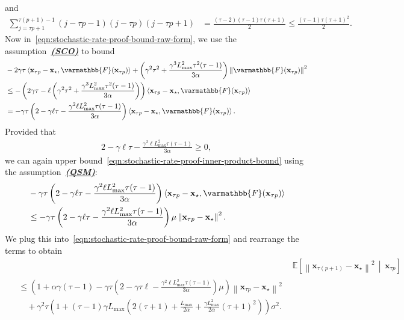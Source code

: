 \documentclass{article}
\newcommand{\vx}{{\mathbf{x}}}
\newcommand{\opF}{{\varmathbb{F}}}
\newcommand{\inprod}[2]{\left\langle #1,#2 \right\rangle}
\newcommand{\sqnorm}[1]{\left\| #1 \right\|^2}
\theoremstyle{plain}
\theoremstyle{remark}
\begin{document}
and
\begin{align*}
    \sum_{j=\tau p+1}^{\tau(p+1)-1} (j-\tau p-1)(j-\tau p)(j-\tau p+1) & = \frac{(\tau-2)(\tau-1)\tau(\tau+1)}{2} \le \frac{(\tau-1)\tau(\tau+1)^2}{2} .
\end{align*}
Now in~\eqref{eqn:stochastic-rate-proof-bound-raw-form}, we use the assumption~\hyperref[assumption:star-cocoercivity]{\textbf{\emph{(SCO)}}} to bound
\begin{align}
    & -2\gamma \tau \inprod{\vx_{\tau p} - \vx_\star}{\opF(\vx_{\tau p})} + \left( \gamma^2 \tau^2 + \frac{\gamma^3 L_{\mathrm{max}}^2 \tau^2 (\tau-1)}{3\alpha} \right) \sqnorm{\opF(\vx_{\tau p})} \nonumber \\
    & \le - \left( 2\gamma \tau - \ell \left( \gamma^2 \tau^2 + \frac{\gamma^3 L_{\mathrm{max}}^2 \tau^2 (\tau-1)}{3\alpha} \right) \right) \inprod{\vx_{\tau p} - \vx_\star}{\opF(\vx_{\tau p})} \nonumber \\
    & = -\gamma\tau \left( 2 - \gamma\ell \tau - \frac{\gamma^2 \ell L_{\mathrm{max}}^2 \tau(\tau-1)}{3\alpha} \right) \inprod{\vx_{\tau p} - \vx_\star}{\opF(\vx_{\tau p})} .
    \label{eqn:stochastic-rate-proof-inner-product-bound}
\end{align}
Provided that
\begin{align}
    2 - \gamma\ell \tau - \frac{\gamma^2 \ell L_{\mathrm{max}}^2 \tau(\tau-1)}{3\alpha} \ge 0 ,
    \label{eqn:stochastic-rate-proof-inner-product-factor-positivity}
\end{align}
we can again upper bound~\eqref{eqn:stochastic-rate-proof-inner-product-bound} using the assumption~\hyperref[assumption:quasi-strong-monotonicity]{\textbf{\emph{(QSM)}}}:
\begin{align*}
    & -\gamma\tau \left( 2 - \gamma\ell \tau - \frac{\gamma^2 \ell L_{\mathrm{max}}^2 \tau(\tau-1)}{3\alpha} \right) \inprod{\vx_{\tau p} - \vx_\star}{\opF(\vx_{\tau p})} \\
    & \le -\gamma \tau \left( 2 - \gamma\ell \tau - \frac{\gamma^2 \ell L_{\mathrm{max}}^2 \tau(\tau-1)}{3\alpha} \right) \mu \sqnorm{\vx_{\tau p} - \vx_\star} .
\end{align*}
We plug this into~\eqref{eqn:stochastic-rate-proof-bound-raw-form} and rearrange the terms to obtain
\begin{align}
    & \mathbb{E} \left[\sqnorm{\vx_{\tau (p+1)} - \vx_\star} \,\middle|\, \vx_{\tau p} \right] \nonumber \\
    \begin{split}
    & \le \left( 1 + \alpha\gamma (\tau - 1) - \gamma\tau \left( 2 - \gamma\tau\ell - \frac{\gamma^2 \ell L_{\mathrm{max}}^2 \tau(\tau-1)}{3\alpha} \right) \mu \right) \sqnorm{\vx_{\tau p} - \vx_\star}  \\
    & \quad + \gamma^2 \tau \left( 1 + (\tau-1) \gamma L_\mathrm{max} \left( 2(\tau+1) + \frac{L_\mathrm{max}}{2\alpha} + \frac{\gamma L_\mathrm{max}^2}{2\alpha} (\tau+1)^2 \right) \right) \sigma^2 . 
    \end{split}
    \label{eqn:stochastic-rate-proof-final-bound-with-alpha}
\end{align}
\end{document}
